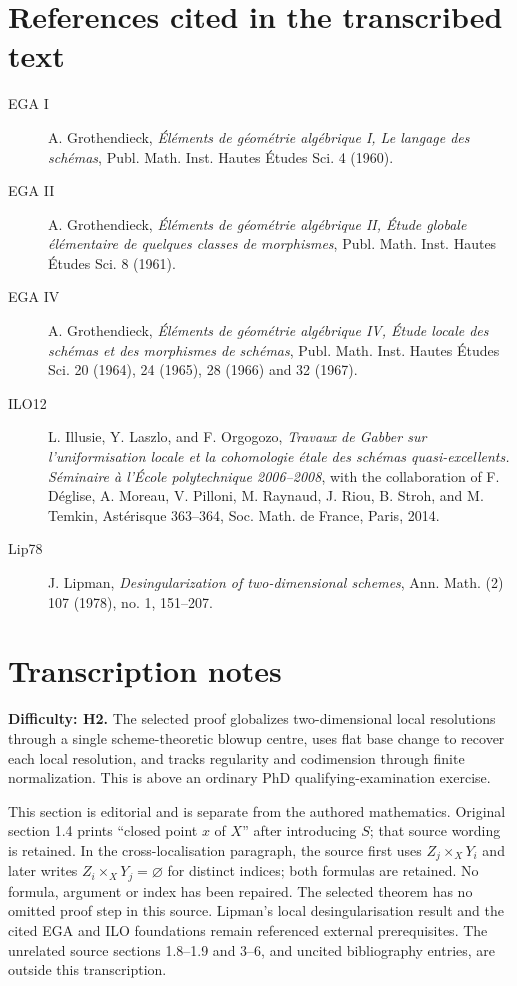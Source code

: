 \documentclass[11pt]{article}
\begin{document}
\section*{References cited in the transcribed text}
\begin{description}
\item[EGA I] A. Grothendieck, \emph{Éléments de géométrie algébrique I, Le langage des schémas}, Publ. Math. Inst. Hautes Études Sci. 4 (1960).
\item[EGA II] A. Grothendieck, \emph{Éléments de géométrie algébrique II, Étude globale élémentaire de quelques classes de morphismes}, Publ. Math. Inst. Hautes Études Sci. 8 (1961).
\item[EGA IV] A. Grothendieck, \emph{Éléments de géométrie algébrique IV, Étude locale des schémas et des morphismes de schémas}, Publ. Math. Inst. Hautes Études Sci. 20 (1964), 24 (1965), 28 (1966) and 32 (1967).
\item[ILO12] L. Illusie, Y. Laszlo, and F. Orgogozo, \emph{Travaux de Gabber sur l'uniformisa\-tion locale et la cohomologie étale des schémas quasi-excellents. Séminaire à l'École polytechnique 2006--2008}, with the collaboration of F. Déglise, A. Moreau, V. Pilloni, M. Raynaud, J. Riou, B. Stroh, and M. Temkin, Astérisque 363--364, Soc. Math. de France, Paris, 2014.
\item[Lip78] J. Lipman, \emph{Desingularization of two-dimensional schemes}, Ann. Math. (2) 107 (1978), no. 1, 151--207.
\end{description}

\section*{Transcription notes}
\noindent\textbf{Difficulty: H2.} The selected proof globalizes two-dimensional local resolutions through a single scheme-theoretic blowup centre, uses flat base change to recover each local resolution, and tracks regularity and codimension through finite normalization. This is above an ordinary PhD qualifying-examination exercise.

\noindent This section is editorial and is separate from the authored mathematics. Original section 1.4 prints ``closed point $x$ of $X$'' after introducing $S$; that source wording is retained. In the cross-localisation paragraph, the source first uses $Z_j\times_XY_i$ and later writes $Z_i\times_XY_j=\varnothing$ for distinct indices; both formulas are retained. No formula, argument or index has been repaired. The selected theorem has no omitted proof step in this source. Lipman's local desingularisation result and the cited EGA and ILO foundations remain referenced external prerequisites. The unrelated source sections 1.8--1.9 and 3--6, and uncited bibliography entries, are outside this transcription.
\end{document}
